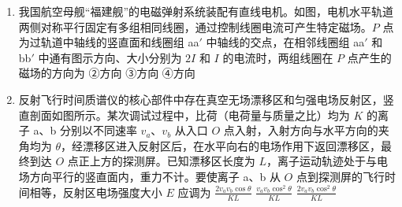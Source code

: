 \documentclass[\gkver]{gaokaozhenti}
\begin{document}
\begin{enumerate}
{B．根据同侧法可知 $t=0$ 时，$x=2\Um$ 处质点振动方向沿 $y$ 轴正方向，故 B 正确；

C．$t=0$ 时，两列波分别传播至 $x=4\Um$ 和 $x=6\Um$ 处，两波前端的间距为 $\Delta x=6\Um-4\Um=2\Um$。两波相向传播，相对速度为 $2v$，相遇时间 $t=\frac{\Delta x}{2v}=\frac{2}{2\times2}\Us=0.5\Us$，故 C 错误；

D．简谐横波传播过程中，介质中的质点仅在平衡位置附近沿 $y$ 轴方向振动，不会随波沿 $x$ 轴方向迁移，因此 $x=8\Um$ 处质点不会沿 $x$ 轴移动，故 D 错误。

故选 B。
}

\item
我国航空母舰“福建舰”的电磁弹射系统装配有直线电机。如图，电机水平轨道两侧对称平行固定有多组相同线圈，通过控制线圈电流可产生特定磁场。$P$ 点为过轨道中轴线的竖直面和线圈组 aa$'$ 中轴线的交点，在相邻线圈组 aa$'$ 和 bb$'$ 中通有图示方向、大小分别为 $2I$ 和 $I$ 的电流时，两组线圈在 $P$ 点产生的磁场的方向为
\onepicture[w=6.05cm]{}
{②方向}
{③方向}
{④方向}

\item
反射飞行时间质谱仪的核心部件中存在真空无场漂移区和匀强电场反射区，竖直剖面如图所示。某次调试过程中，比荷（电荷量与质量之比）均为 $K$ 的离子 a、b 分别以不同速率 $v_a$、$v_b$ 从入口 $O$ 点入射，入射方向与水平方向的夹角均为 $\theta$，经漂移区进入反射区后，在水平向右的电场作用下返回漂移区，最终到达 $O$ 点正上方的探测屏。已知漂移区长度为 $L$，离子运动轨迹处于与电场方向平行的竖直面内，重力不计。要使离子 a、b 从 $O$ 点到探测屏的飞行时间相等，反射区电场强度大小 $E$ 应调为
{$\frac{2v_av_b\cos\theta}{KL}$}
{$\frac{v_av_b\cos^2\theta}{KL}$}
{$\frac{2v_av_b\cos^2\theta}{KL}$}
\end{enumerate}
\end{document}
